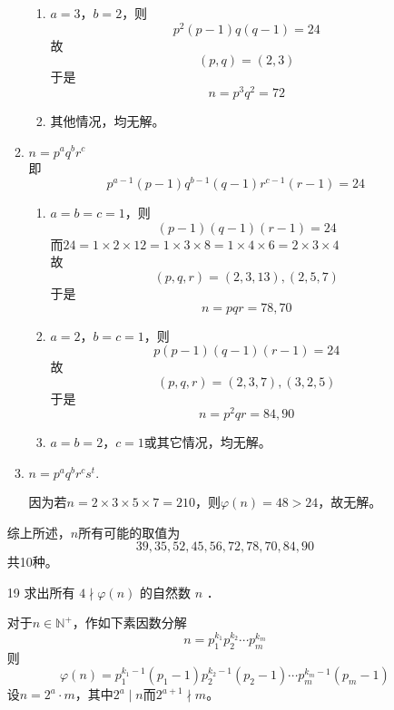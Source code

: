 \begin{enumerate}
\begin{solution}
\begin{enumerate}
\begin{enumerate}
          \item $a=3$，$b=2$，则
          \[p^2(p-1)q(q-1)=24\]
          故
          \[(p,q)=(2,3)\]
          于是
          \[n=p^3q^2=72\]
          \item 其他情况，均无解。
        \end{enumerate}
        \item $n=p^aq^br^c$\\
        即
        \[p^{a-1}(p-1)q^{b-1}(q-1)r^{c-1}(r-1)=24\]
        \begin{enumerate}
          \item $a=b=c=1$，则
          \[(p-1)(q-1)(r-1)=24\]
          而$24=1\times 2\times 12=1\times 3\times 8=1\times 4\times 6=2\times 3\times 4$\\
          故
          \[(p,q,r)=(2,3,13),(2,5,7)\]
          于是
          \[n=pqr=78,70\]
          \item $a=2$，$b=c=1$，则
          \[p(p-1)(q-1)(r-1)=24\]
          故
          \[(p,q,r)=(2,3,7),(3,2,5)\]
          于是
          \[n=p^2qr=84,90\]
          \item $a=b=2$，$c=1$或其它情况，均无解。
        \end{enumerate}
        \item $n=p^aq^br^cs^t.$

        因为若$n=2\times 3\times 5\times 7=210$，则$\varphi(n)=48>24$，故无解。
    \end{enumerate}
        综上所述，$n$所有可能的取值为
        \[39,35,52,45,56,72,78,70,84,90\]
        共10种。
    \end{solution}
    \item[19] 求出所有 $4 \nmid \varphi(n)$ 的自然数 $n$ ．
    \begin{solution}
      对于$n\in\mathbb{N}^+$，作如下素因数分解
      \[n=p_1^{k_1}p_2^{k_2}\cdots p_m^{k_m}\]
      则
      \[\varphi(n)=p_1^{k_1-1}(p_1-1)p_2^{k_2-1}(p_2-1)\cdots p_m^{k_m-1}(p_m-1)\]
      设$n=2^a\cdot m$，其中$2^a \mid n$而$2^{a+1} \nmid m$。


\end{solution}
\end{enumerate}
